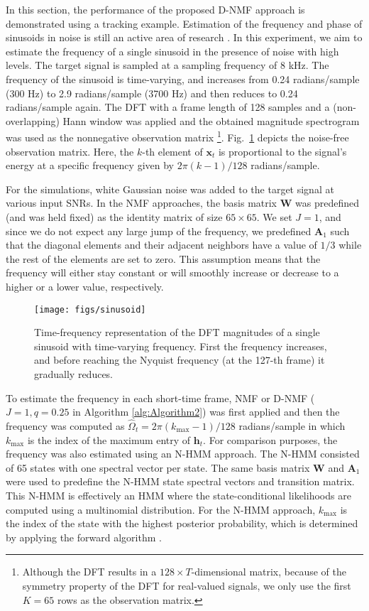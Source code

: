 \documentclass[10pt,twocolumn,twoside] {IEEEtran}
\begin{document}
In this section, the performance of the proposed D-NMF approach is demonstrated
using a tracking example. Estimation of the frequency and phase
of sinusoids in noise is still an active area of research \cite{Fu2007}.
In this experiment, we aim to estimate the frequency of a single
sinusoid in the presence of noise with high levels. The target signal is sampled at a sampling frequency of 8 kHz. The frequency of the sinusoid is time-varying, and increases from 0.24 radians/sample (300 Hz) to 2.9 radians/sample (3700 Hz) and then reduces to 0.24 radians/sample again. The DFT with a frame length of 128 samples and a (non-overlapping) Hann window was applied and the obtained magnitude spectrogram was used as the nonnegative observation matrix%
\footnote{Although the DFT results in a $128\times T$-dimensional matrix,
because of the symmetry property of the DFT for real-valued signals,
we only use the first $K=65$ rows as the observation matrix.%
}. Fig.~\ref{fig:sinusoid} depicts the noise-free observation matrix.
Here, the $k$-th element of $\mathbf{x}_{t}$ is proportional to the signal\textquoteright{}s
energy at a specific frequency given by $2\pi\left(k-1\right)/128$
radians/sample.

For the simulations, white Gaussian noise was added to the target signal at various input SNRs. In the NMF approaches, the basis matrix $\mathbf{W}$ was predefined (and was held fixed) as the
identity matrix of size $65\times65$. We set $J=1$, and since we
do not expect any large jump of the frequency, we predefined
$\mathbf{A}_{1}$ such that the diagonal elements and their adjacent
neighbors have a value of $1/3$ while the rest of the elements are
set to zero. This assumption means that the frequency will either stay constant or will smoothly increase or decrease to a higher or a lower value, respectively.

\begin{figure}
\texttt{[image: figs/sinusoid]}\caption{\label{fig:sinusoid} Time-frequency representation of the DFT magnitudes of a single
sinusoid with time-varying frequency. First the frequency increases, and
before reaching the Nyquist frequency (at the 127-th frame) it gradually reduces.}
\end{figure}

To estimate the frequency in each short-time frame, NMF
or D-NMF ($J=1,q=0.25$ in Algorithm \ref{alg:Algorithm2}) was first applied and then the frequency was computed as
$\hat{\Omega}_{t}=2\pi\left(k_{\text{max}}-1\right)/128$ radians/sample
in which $k_{\text{max}}$ is the index of the maximum entry of $\mathbf{h}_{t}.$ For comparison purposes, the frequency was also estimated using an N-HMM approach. The N-HMM consisted of 65 states with one spectral vector per state. The same basis matrix $\mathbf{W}$ and $\mathbf{A}_{1}$ were used to predefine the N-HMM state spectral vectors and transition matrix. This N-HMM is effectively an HMM where the state-conditional likelihoods are computed using a multinomial distribution. For the N-HMM approach, $k_{\text{max}}$ is the index of the state with the highest posterior probability, which is determined by applying the forward algorithm \cite{Rabiner1989}.
\end{document}
